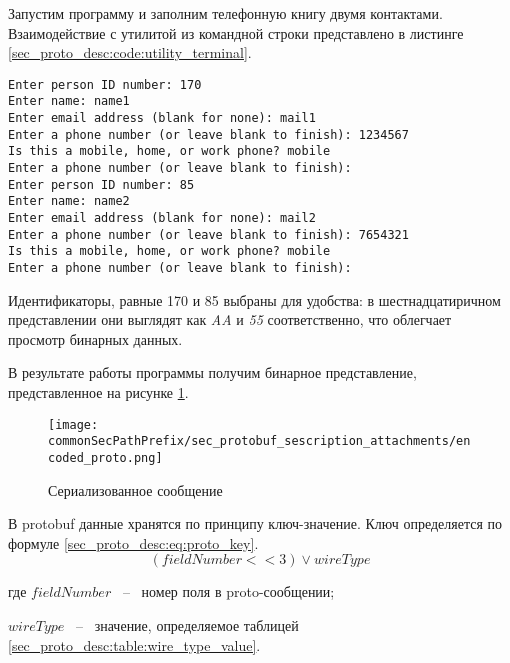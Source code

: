 Запустим программу и заполним телефонную книгу двумя контактами. Взаимодействие с утилитой из командной строки представлено в листинге \ref{sec_proto_desc:code:utility_terminal}.

\noindent\begin{minipage}{\linewidth}
\begin{lstlisting}[style=CodeListing, caption={Взаимодействие с утилитой для заполнения и сериализации сообщений}, label=sec_proto_desc:code:utility_terminal]
Enter person ID number: 170
Enter name: name1
Enter email address (blank for none): mail1
Enter a phone number (or leave blank to finish): 1234567
Is this a mobile, home, or work phone? mobile
Enter a phone number (or leave blank to finish):
Enter person ID number: 85
Enter name: name2
Enter email address (blank for none): mail2
Enter a phone number (or leave blank to finish): 7654321
Is this a mobile, home, or work phone? mobile
Enter a phone number (or leave blank to finish):
\end{lstlisting}
\end{minipage}

Идентификаторы, равные 170 и 85 выбраны для удобства: в шестнадцатиричном представлении они выглядят как \textit{AA} и \textit{55} соответственно, что облегчает просмотр бинарных данных.

В результате работы программы получим бинарное представление, представленное на рисунке \ref{fig:encoded_proto}.
\begin{figure}[ht]
    \centering
    \texttt{[image: \\commonSecPathPrefix/sec\_protobuf\_sescription\_attachments/encoded\_proto.png]}
    \caption{Сериализованное сообщение}
    \label{fig:encoded_proto}
\end{figure}

В protobuf данные хранятся по принципу ключ-значение. Ключ определяется по формуле \eqref{sec_proto_desc:eq:proto_key}\cite{protobuf_habr}.
\begin{equation}
    \label{sec_proto_desc:eq:proto_key}
    (fieldNumber << 3) \lor wireType
\end{equation}
\begin{explanationx}
\item [где] $ fieldNumber $ ~--~ номер поля в proto-сообщении;
\item       $ wireType $ ~--~ значение, определяемое таблицей \ref{sec_proto_desc:table:wire_type_value}.
\end{explanationx}

\pagebreak

